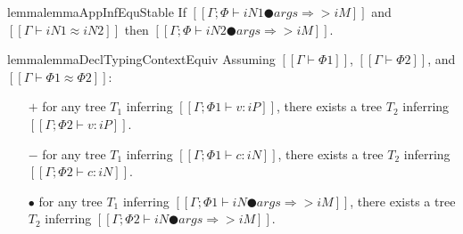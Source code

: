 
\begin{restatable}{lemma}{lemmaAppInfEquStable}
    \label{lemma:app-inf-equ-stable}
    If $[[Γ; Φ ⊢ iN1 ● args ⇒> iM]]$ and $[[Γ ⊢ iN1 ≈ iN2]]$ 
    then $[[Γ; Φ ⊢ iN2 ● args ⇒> iM]]$.
\end{restatable}

\begin{restatable}{lemma}{lemmaDeclTypingContextEquiv}
    \label{lemma:decl-typing-context-equiv}
    Assuming $[[Γ ⊢ Φ1]]$, $[[Γ ⊢ Φ2]]$, and $[[Γ ⊢ Φ1 ≈ Φ2]]$:
    \begin{itemize}
        \item [$+$] 
            for any tree $T_1$ inferring $[[Γ ; Φ1 ⊢ v : iP]]$, 
            there exists a tree $T_2$ inferring $[[Γ ; Φ2 ⊢ v : iP]]$.
        \item [$-$] 
            for any tree $T_1$ inferring $[[Γ ; Φ1 ⊢ c : iN]]$, 
            there exists a tree $T_2$ inferring $[[Γ ; Φ2 ⊢ c : iN]]$.
        \item [$\bullet$] 
            for any tree $T_1$ inferring $[[Γ ; Φ1 ⊢ iN ● args ⇒> iM]]$, 
            there exists a tree $T_2$ inferring $[[Γ ; Φ2 ⊢ iN ● args ⇒> iM]]$.
    \end{itemize}
\end{restatable}
